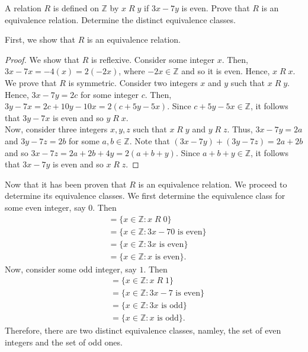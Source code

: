 \documentclass[12pt]{article}
\newcommand{\Z}{\mathbb{Z}}
\newenvironment{problem}[2][Problem]{\begin{trivlist}
		\item[\hskip \labelsep {\bfseries #1}\hskip \labelsep {\bfseries #2.}]}{\end{trivlist}}
\newenvironment{solution}[2][Solution]{\begin{trivlist}
		\item[\hskip \labelsep {\bfseries #1}\hskip \labelsep {\bfseries #2.}]}{\end{trivlist}}
\begin{document}
 	\begin{problem}{40}
 		A relation $R$ is defined on $\Z$ by $x\; R \;y$ if $3x-7y$ is even. Prove that $R$ is an equivalence relation. Determine the distinct equivalence classes.
 		\begin{solution}{40}
 			First, we show that $R$ is an equivalence relation.
 			\begin{proof}
 				We show that $R$ is reflexive. Consider some integer $x$. Then, $3x-7x = -4(x) = 2(-2x)$, where $-2x\in \Z$ and so it is even. Hence, $x\;R \;x$. \\
 				We prove that $R$ is symmetric. Consider two integers $x$ and $y$ such that $x\; R \; y$. Hence, $3x-7y = 2c$ for some integer $c$. Then, $3y-7x = 2c +10y-10x = 2(c+5y-5x)$. Since $c+5y-5x\in \Z$, it follows that $3y-7x$ is even and so $y\; R \;x$.\\
 				Now, consider three integers $x,y,z$ such that $x\; R \;y$ and $y\; R \; z$. Thus, $3x-7y = 2a$ and $3y-7z = 2b$ for some $a,b\in \Z$. Note that $(3x-7y) + (3y-7z) = 2a+2b$ and so $3x-7z = 2a+2b +4y = 2(a+b+y)$. Since $a+b+y\in \Z$, it follows that $3x-7y$ is even and so $x\; R \;z$.
 			\end{proof}
 		Now that it has been proven that $R$ is an equivalence relation. We proceed to determine its equivalence classes. We first determine the equivalence class for some even integer, say 0. Then
 		\begin{align*}
 			[0] &= \{x\in \Z:x\; R \; 0\}\\
 			&= \{x\in \Z: 3x-70 \text{ is even}\}\\
 			&= \{x\in \Z: 3x \text{ is even}\}\\
 			&= \{x\in \Z: x \text{ is even}\}.
 		\end{align*}
 	Now, consider some odd integer, say $1$. Then
 	\begin{align*}
 		[1] &= \{x\in \Z : x\; R \;1\}\\
 		&= \{x\in \Z : 3x-7 \text{ is even}\}\\
 		&= \{x\in \Z: 3x \text{ is odd}\}\\
 		&= \{x\in \Z: x \text{ is odd}\}.
 	\end{align*}
 Therefore, there are two distinct equivalence classes, namley, the set of even integers and the set of odd ones.
 		\end{solution} 
 	\end{problem} 
 
\end{document}
